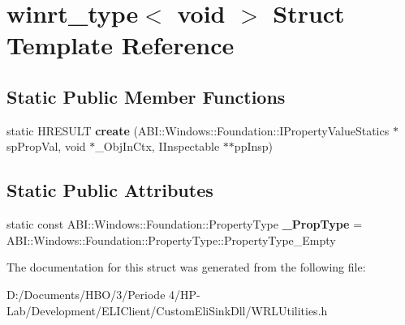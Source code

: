 \hypertarget{structwinrt__type_3_01void_01_4}{}\section{winrt\+\_\+type$<$ void $>$ Struct Template Reference}
\label{structwinrt__type_3_01void_01_4}
\subsection*{Static Public Member Functions}
\begin{DoxyCompactItemize}
\item 
\mbox{\label{structwinrt__type_3_01void_01_4_ae68c65afc636dbd8800ae91f64b2e99a}} 
static H\+R\+E\+S\+U\+LT {\bfseries create} (A\+B\+I\+::\+Windows\+::\+Foundation\+::\+I\+Property\+Value\+Statics $\ast$sp\+Prop\+Val, void $\ast$\+\_\+\+Obj\+In\+Ctx, I\+Inspectable $\ast$$\ast$pp\+Insp)
\end{DoxyCompactItemize}
\subsection*{Static Public Attributes}
\begin{DoxyCompactItemize}
\item 
\mbox{\label{structwinrt__type_3_01void_01_4_ac3e5342a04682e2d7949084a2a33ba37}} 
static const A\+B\+I\+::\+Windows\+::\+Foundation\+::\+Property\+Type {\bfseries \+\_\+\+Prop\+Type} = A\+B\+I\+::\+Windows\+::\+Foundation\+::\+Property\+Type\+::\+Property\+Type\+\_\+\+Empty
\end{DoxyCompactItemize}


The documentation for this struct was generated from the following file\+:\begin{DoxyCompactItemize}
\item 
D\+:/\+Documents/\+H\+B\+O/3/\+Periode 4/\+H\+P-\/\+Lab/\+Development/\+E\+L\+I\+Client/\+Custom\+Eli\+Sink\+Dll/W\+R\+L\+Utilities.\+h\end{DoxyCompactItemize}
